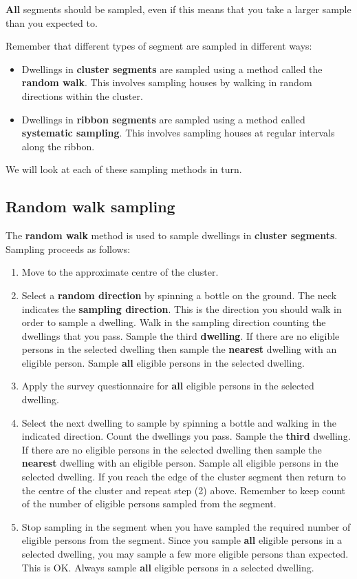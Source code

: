 \documentclass[12pt,a4paper]{book}
\theoremstyle{definition}
\theoremstyle{definition}
\theoremstyle{definition}
\theoremstyle{remark}
\begin{document}
\textbf{All} segments should be sampled, even if this means that you
take a larger sample than you expected to.

Remember that different types of segment are sampled in different ways:

\begin{itemize}
\item
  Dwellings in \textbf{cluster segments} are sampled using a method
  called the \textbf{random walk}. This involves sampling houses by
  walking in random directions within the cluster.
\item
  Dwellings in \textbf{ribbon segments} are sampled using a method
  called \textbf{systematic sampling}. This involves sampling houses at
  regular intervals along the ribbon.
\end{itemize}

We will look at each of these sampling methods in turn.

\hypertarget{random-walk-sampling}{%
\subsection{Random walk sampling}\label{random-walk-sampling}}

The \textbf{random walk} method is used to sample dwellings in
\textbf{cluster segments}. Sampling proceeds as follows:

\begin{enumerate}
\def\labelenumi{\arabic{enumi}.}
\item
  Move to the approximate centre of the cluster.
\item
  Select a \textbf{random direction} by spinning a bottle on the ground.
  The neck indicates the \textbf{sampling direction}. This is the
  direction you should walk in order to sample a dwelling. Walk in the
  sampling direction counting the dwellings that you pass. Sample the
  third \textbf{dwelling}. If there are no eligible persons in the
  selected dwelling then sample the \textbf{nearest} dwelling with an
  eligible person. Sample \textbf{all} eligible persons in the selected
  dwelling.
\item
  Apply the survey questionnaire for \textbf{all} eligible persons in
  the selected dwelling.
\item
  Select the next dwelling to sample by spinning a bottle and walking in
  the indicated direction. Count the dwellings you pass. Sample the
  \textbf{third} dwelling. If there are no eligible persons in the
  selected dwelling then sample the \textbf{nearest} dwelling with an
  eligible person. Sample all eligible persons in the selected dwelling.
  If you reach the edge of the cluster segment then return to the centre
  of the cluster and repeat step (2) above. Remember to keep count of
  the number of eligible persons sampled from the segment.
\item
  Stop sampling in the segment when you have sampled the required number
  of eligible persons from the segment. Since you sample \textbf{all}
  eligible persons in a selected dwelling, you may sample a few more
  eligible persons than expected. This is OK. Always sample \textbf{all}
  eligible persons in a selected dwelling.
\end{enumerate}
\end{document}
